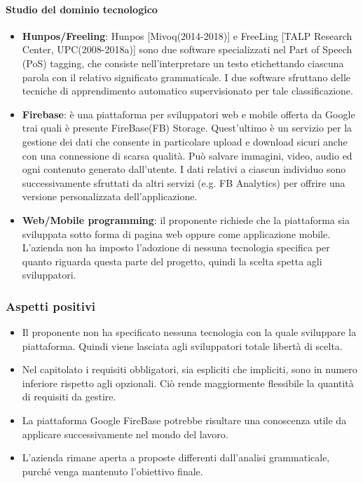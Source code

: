 \paragraph{Studio del dominio tecnologico}
\begin{itemize}
	\item \textbf{Hunpos/Freeling}: Hunpos [Mivoq(2014-2018)] e FreeLing [TALP Research Center, UPC(2008-2018a)] sono due software specializzati nel Part of Speech (PoS) tagging, che consiste nell'interpretare un testo etichettando ciascuna parola con il relativo significato grammaticale. I due software sfruttano delle tecniche di apprendimento automatico supervisionato per tale classificazione.  
	
	\item \textbf{Firebase}: è una piattaforma per sviluppatori web e mobile offerta da Google trai quali è presente FireBase(FB) Storage. Quest'ultimo è un servizio per la gestione dei dati che consente in particolare upload e download sicuri anche con una connessione di scarsa qualità. Può salvare immagini, video, audio ed ogni contenuto generato dall'utente. I dati relativi a ciascun individuo sono successivamente sfruttati da altri servizi (e.g. FB Analytics) per offrire una versione personalizzata dell'applicazione.
	\item \textbf{Web/Mobile programming}: il proponente richiede che la piattaforma sia sviluppata sotto forma di pagina web oppure come applicazione mobile. L'azienda non ha imposto l'adozione di nessuna tecnologia specifica per quanto riguarda questa parte del progetto, quindi la scelta spetta agli sviluppatori.		
\end{itemize}
\subsubsection{Aspetti positivi}
\begin{itemize}
	\item Il proponente non ha specificato nessuna tecnologia con la quale sviluppare la piattaforma. Quindi viene lasciata agli sviluppatori totale libertà di scelta.
	\item Nel capitolato i requisiti obbligatori, sia espliciti che impliciti, sono in numero inferiore rispetto agli opzionali. Ciò rende maggiormente flessibile la quantità di requisiti da gestire.
	\item La piattaforma Google FireBase potrebbe risultare una conoscenza utile da applicare successivamente nel mondo del lavoro.
	\item L'azienda rimane aperta a proposte differenti dall'analisi grammaticale, purché venga mantenuto l'obiettivo finale.
	
\end{itemize}
